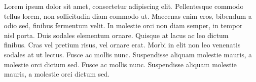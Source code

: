 \documentclass[b5paper,12pt,twoside,openright]{book}
\begin{document}

Lorem ipsum dolor sit amet, consectetur adipiscing elit. Pellentesque commodo tellus lorem, non sollicitudin diam commodo ut. Maecenas enim eros, bibendum a odio sed, finibus fermentum velit. In molestie orci non diam semper, in tempor nisl porta. Duis sodales elementum ornare. Quisque at lacus ac leo dictum finibus. Cras vel pretium risus, vel ornare erat. Morbi in elit non leo venenatis sodales at ut lectus. Fusce ac mollis nunc. Suspendisse aliquam molestie mauris, a molestie orci dictum sed. Fusce ac mollis nunc. Suspendisse aliquam molestie mauris, a molestie orci dictum sed. 
\end{document}
